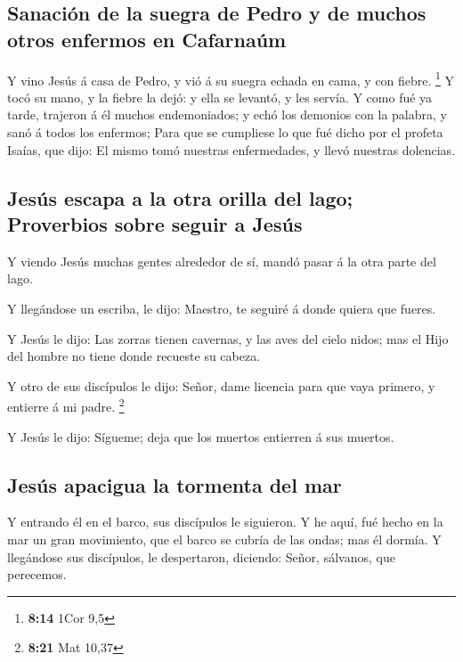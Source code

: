 \hypertarget{sanaciuxf3n-de-la-suegra-de-pedro-y-de-muchos-otros-enfermos-en-cafarnauxfam}{%
\subsection{Sanación de la suegra de Pedro y de muchos otros enfermos en
Cafarnaúm}\label{sanaciuxf3n-de-la-suegra-de-pedro-y-de-muchos-otros-enfermos-en-cafarnauxfam}}

 Y vino Jesús á casa de Pedro, y vió á su suegra echada en
cama, y con fiebre. \footnote{\textbf{8:14} 1Cor 9,5}  Y
tocó su mano, y la fiebre la dejó: y ella se levantó, y les servía.
 Y como fué ya tarde, trajeron á él muchos endemoniados; y
echó los demonios con la palabra, y sanó á todos los enfermos;
 Para que se cumpliese lo que fué dicho por el profeta
Isaías, que dijo: El mismo tomó nuestras enfermedades, y llevó nuestras
dolencias.

\hypertarget{jesuxfas-escapa-a-la-otra-orilla-del-lago-proverbios-sobre-seguir-a-jesuxfas}{%
\subsection{Jesús escapa a la otra orilla del lago; Proverbios sobre
seguir a
Jesús}\label{jesuxfas-escapa-a-la-otra-orilla-del-lago-proverbios-sobre-seguir-a-jesuxfas}}

 Y viendo Jesús muchas gentes alrededor de sí, mandó pasar
á la otra parte del lago.

 Y llegándose un escriba, le dijo: Maestro, te seguiré á
donde quiera que fueres.

 Y Jesús le dijo: Las zorras tienen cavernas, y las aves
del cielo nidos; mas el Hijo del hombre no tiene donde recueste su
cabeza.

 Y otro de sus discípulos le dijo: Señor, dame licencia
para que vaya primero, y entierre á mi padre. \footnote{\textbf{8:21}
  Mat 10,37}

 Y Jesús le dijo: Sígueme; deja que los muertos entierren á
sus muertos.

\hypertarget{jesuxfas-apacigua-la-tormenta-del-mar}{%
\subsection{Jesús apacigua la tormenta del
mar}\label{jesuxfas-apacigua-la-tormenta-del-mar}}

 Y entrando él en el barco, sus discípulos le siguieron.
 Y he aquí, fué hecho en la mar un gran movimiento, que el
barco se cubría de las ondas; mas él dormía.  Y llegándose
sus discípulos, le despertaron, diciendo: Señor, sálvanos, que
perecemos.

